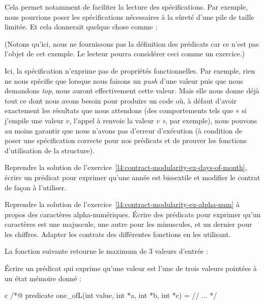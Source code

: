 Cela permet notamment de faciliter la lecture des spécifications. Par exemple, nous
pourrions poser les spécifications nécessaires à la sûreté d'une pile de taille
limitée. Et cela donnerait quelque chose comme :




(Notons qu'ici, nous ne fournissons pas la définition des prédicats car ce n'est
pas l'objet de cet exemple. Le lecteur pourra considérer ceci comme un exercice.)

Ici, la spécification n'exprime pas de propriétés fonctionnelles. Par exemple,
rien ne nous spécifie que lorsque nous faisons un \textit{push} d'une valeur puis que nous
demandons \textit{top}, nous auront effectivement cette valeur. Mais elle nous donne
déjà tout ce dont nous avons besoin pour produire un code où, à défaut d'avoir
exactement les résultats que nous attendons (des comportements tels que « si
j'empile une valeur $v$, l'appel à  renvoie la valeur $v$ », par exemple), nous
pouvons au moins garantir que nous n'avons pas d'erreur d'exécution (à condition
de poser une spécification correcte pour nos prédicats et de prouver les fonctions
d'utilisation de la structure).






Reprendre la solution de l'exercice~\ref{l4:contract-modularity-ex-days-of-month},
écrire un prédicat pour exprimer qu'une année est bissextile et modifier le contrat
de façon à l'utiliser.




Reprendre la solution de l'exercice~\ref{l4:contract-modularity-ex-alpha-num} à
propos des caractères alpha-numériques. Écrire des prédicats pour exprimer qu'un
caractères est une majuscule, une autre pour les minuscules, et un dernier pour les
chiffres. Adapter les contrats des différentes fonctions en les utilisant.




La fonction suivante retourne le maximum de 3 valeurs d'entrée :




Écrire un prédicat qui exprime qu'une valeur est l'une de trois valeurs pointées
à un état mémoire donné :


\begin{CodeBlock}{c}
  /*@
  predicate one_of{L}(int value, int *a, int *b, int *c) =
  // ...
  */
\end{CodeBlock}



